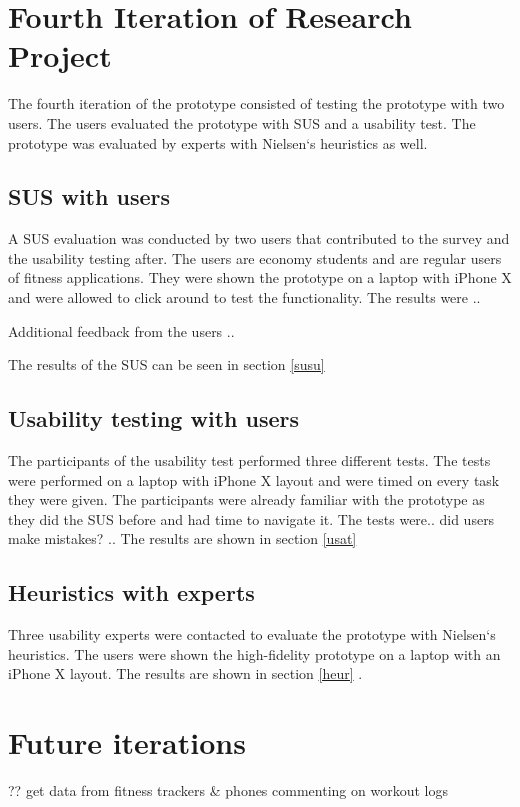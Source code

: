 \section{Fourth Iteration of Research Project}
The fourth iteration of the prototype consisted of testing the prototype with two users. The users evaluated the prototype with SUS and a usability test. The prototype was evaluated by experts with Nielsen`s heuristics as well.

\subsection{SUS with users}
A SUS evaluation was conducted by two users that contributed to the survey and the usability testing after. The users are economy students and are regular users of fitness applications.
They were shown the prototype on a laptop with iPhone X and were allowed to click around to test the functionality. The results were ..

Additional feedback from the users .. 

The results of the SUS can be seen in section \ref{susu} 

\subsection{Usability testing with users}
The participants of the usability test performed three different tests. The tests were performed on a laptop with iPhone X layout and were timed on every task they were given. The participants were already familiar with the prototype as they did the SUS before and had time to navigate it. The tests were.. did users make mistakes? .. The results are shown in section \ref{usat}

\subsection{Heuristics with experts}
Three usability experts were contacted to evaluate the prototype with Nielsen`s heuristics. The users were shown the high-fidelity prototype on a laptop with an iPhone X layout. The results are shown in section \ref{heur} .


\section{Future iterations}
??
get data from fitness trackers & phones 
commenting on workout logs



